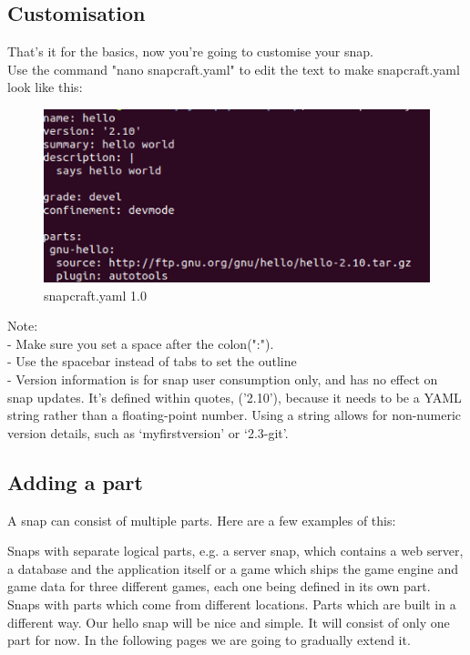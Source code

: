 \documentclass{article}
\begin{document}
\begin{flushleft}
\section{Customisation}\label{sec:customisation}
That's it for the basics, now you're going to customise your snap.\\
Use the command "nano snapcraft.yaml" to edit the text to make snapcraft.yaml look like this:\\
\label{fig:step5}

	\begin{figure}[H]
	\includegraphics[width=5in]{step5.png}
	\caption[Optional caption]{snapcraft.yaml 1.0}
	\end{figure}
\begin{flushleft}	

Note:\\
- Make sure you set a space after the colon(":").\\
- Use the spacebar instead of tabs to set the outline\\
- Version information is for snap user consumption only, and has no effect on snap updates. It's defined within quotes, ('2.10'), because it needs to be a YAML string rather than a floating-point number. Using a string allows for non-numeric version details, such as ‘myfirstversion' or ‘2.3-git'.
\cleardoublepage
%
%
%
%
%
\subsection{Adding a part}\label{sec:adding part}
A snap can consist of multiple parts. Here are a few examples of this:

Snaps with separate logical parts, e.g. a server snap, which contains a web server, a database
and the application itself or a game which ships the game engine and game data for three
different games, each one being defined in its own part.
Snaps with parts which come from different locations.
Parts which are built in a different way.
Our hello snap will be nice and simple. It will consist of only one part for now. In the
following pages we are going to gradually extend it.\\


\end{flushleft}
\end{flushleft}
\end{document}
